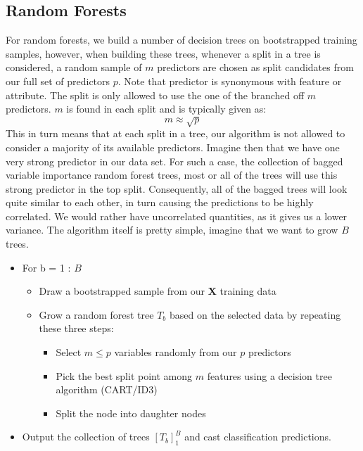 \documentclass{article}
\begin{document}
\subsection{Random Forests}
For random forests, we build a number of decision trees on bootstrapped training samples, however, when building these trees, whenever a split in a tree is considered, a random sample of $m$ predictors are chosen as split candidates from our full set of predictors $p$. Note that predictor is synonymous with feature or attribute. The split is only allowed to use the one of the branched off $m$ predictors. \newline
$m$ is found in each split and is typically given as:
\begin{equation*}
    m \approx \sqrt{p}
\end{equation*}
This in turn means that at each split in a tree, our algorithm is not allowed to consider a majority of its available predictors.\newline
Imagine then that we have one very strong predictor in our data set. For such a case, the collection of bagged variable importance random forest trees, most or all of the trees will use this strong predictor in the top split. Consequently, all of the bagged trees will look quite similar to each other, in turn causing the predictions to be highly correlated. We would rather have uncorrelated quantities, as it gives us a lower variance.
\newline
The algorithm itself is pretty simple, imagine that we want to grow $B$ trees.
\begin{itemize}
    \item For b = 1 : $B$
    \begin{itemize}
        \item Draw a bootstrapped sample from our $\mathbf{X}$ training data
        \item Grow a random forest tree $T_b$ based on the selected data by repeating these three steps:
        \begin{itemize}
            \item Select $m \leq p$ variables randomly from our $p$ predictors
            \item Pick the best split point among $m$ features using a decision tree algorithm (CART/ID3)
            \item Split the node into daughter nodes
        \end{itemize}
    \end{itemize}
    \item Output the collection of trees $[T_b]_1^B$ and cast classification predictions.
\end{itemize}
\end{document}
